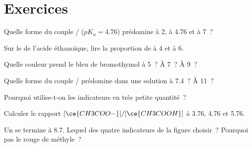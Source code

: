 \section{Exercices}


\begin{exercise}[$\star$]\label{exo:g12:buffers-predominance:1}
Quelle forme du couple / ($pK_a = 4.76$)
prédomine à  2, à  4.76 et à  7~?
\end{exercise}

\begin{exercise}[$\star$]\label{exo:g12:buffers-predominance:2}
Sur le  de l'acide éthanoïque, lire la
proportion de
 à  4 et à  6.
\end{exercise}

\begin{exercise}[$\star$]\label{exo:g12:buffers-predominance:3}
Quelle couleur prend le bleu de bromothymol à  5~? À  7~? À  9~?
\end{exercise}

\begin{exercise}[$\star$]\label{exo:g12:buffers-predominance:4}
Quelle forme du couple / prédomine dans une solution à
 7.4~? À  11~?
\end{exercise}

\begin{exercise}[$\star$]\label{exo:g12:buffers-predominance:5}
Pourquoi utilise-t-on les indicateurs en très petite quantité~?
\end{exercise}

\begin{exercise}[$\star\star$]\label{exo:g12:buffers-predominance:6}
Calculer le rapport $[\ce{CH3COO-}]/[\ce{CH3COOH}]$ à  3.76, 4.76 et
5.76.
\end{exercise}

\begin{exercise}[$\star\star$]\label{exo:g12:buffers-predominance:7}
Un  se termine à  8.7. Lequel des quatre indicateurs de la
figure choisir~? Pourquoi pas le rouge de méthyle~?
\end{exercise}

